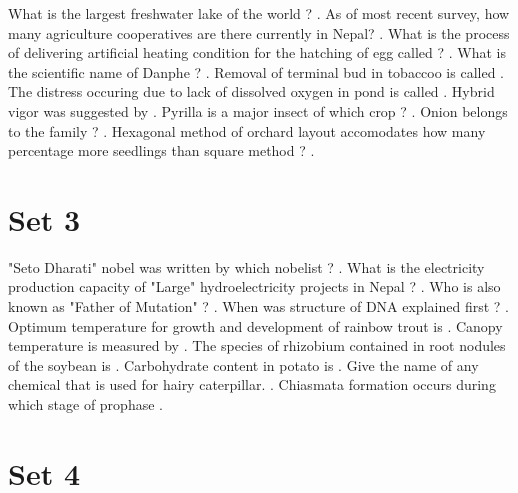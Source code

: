 \documentclass[10pt,a4paper,answers]{exam}
\begin{document}
\begin{questions}
\question What is the largest freshwater lake of the world ? .
\question As of most recent survey, how many agriculture cooperatives are there currently in Nepal? \fillin[9965][3cm].
\question What is the process of delivering artificial heating condition for the hatching of egg called ? \fillin[Incubation][3cm].
\question What is the scientific name of Danphe ? .
\question Removal of terminal bud in tobaccoo is called \fillin[Topping][3cm].
\question The distress occuring due to lack of dissolved oxygen in pond is called \fillin[Asphyxiation][3cm].
\question Hybrid vigor was suggested by \fillin[GH Shull][3cm].
\question Pyrilla is a major insect of which crop ? \fillin[Sugarcane][3cm].
\question Onion belongs to the family ? \fillin[Amaryllidaceae][3cm].
\question Hexagonal method of orchard layout accomodates how many percentage more seedlings than square method ? \fillin[15\%][3cm].
\end{questions}

\section*{Set 3}

\begin{questions}
\question "Seto Dharati" nobel was written by which nobelist ? .
\question What is the electricity production capacity of "Large" hydroelectricity projects in Nepal ? .
\question Who is also known as "Father of Mutation" ? .
\question When was structure of DNA explained first ? \fillin[1953][3cm].
\question Optimum temperature for growth and development of rainbow trout is .
\question Canopy temperature is measured by .
\question The species of rhizobium contained in root nodules of the soybean is .
\question Carbohydrate content in potato is \fillin[70\%][3cm].
\question Give the name of any chemical that is used for hairy caterpillar. . 
\question Chiasmata formation occurs during which stage of prophase \fillin[Diplotene][3cm].
\end{questions}

\section*{Set 4}
\end{document}
